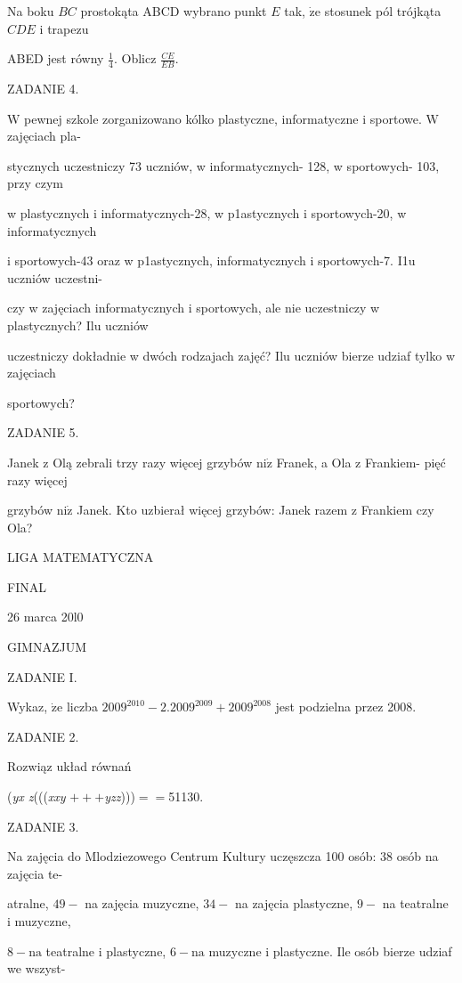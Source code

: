 \documentclass[a4paper,12pt]{article}
\begin{document}
Na boku $BC$ prostokąta ABCD wybrano punkt $E$ tak, $\dot{\mathrm{z}}\mathrm{e}$ stosunek pól trójkąta $CDE$ i trapezu

ABED jest równy $\displaystyle \frac{1}{4}$. Oblicz $\displaystyle \frac{CE}{EB}.$

ZADANIE 4.

$\mathrm{W}$ pewnej szkole zorganizowano kólko plastyczne, informatyczne i sportowe. $\mathrm{W}$ zajęciach pla-

stycznych uczestniczy 73 uczniów, w informatycznych- 128, w sportowych- 103, przy czym

w plastycznych i informatycznych-28, w p1astycznych i sportowych-20, w informatycznych

i sportowych-43 oraz w p1astycznych, informatycznych i sportowych-7. I1u uczniów uczestni-

czy w zajęciach informatycznych i sportowych, ale nie uczestniczy w plastycznych? Ilu uczniów

uczestniczy dokładnie w dwóch rodzajach zajęć? Ilu uczniów bierze udziaf tylko w zajęciach

sportowych?

ZADANIE 5.

Janek z Olą zebrali trzy razy więcej grzybów $\mathrm{n}\mathrm{i}\dot{\mathrm{z}}$ Franek, a Ola z Frankiem- pięć razy więcej

grzybów $\mathrm{n}\mathrm{i}\dot{\mathrm{z}}$ Janek. Kto uzbierał więcej grzybów: Janek razem z Frankiem czy Ola?






LIGA MATEMATYCZNA

FINAL

26 marca 20l0

GIMNAZJUM

ZADANIE I.

Wykaz, $\dot{\mathrm{z}}\mathrm{e}$ liczba $2009^{2010}-2. 2009^{2009}+2009^{2008}$ jest podzielna przez 2008.

ZADANIE 2.

Rozwiąz układ równań

({\it yx  z}((({\it xxy} $+++${\it yzz})))$==$51130.

ZADANIE 3.

Na zajęcia do Mlodziezowego Centrum Kultury uczęszcza 100 osób: 38 osób na zajęcia te-

atralne, $49-$ na zajęcia muzyczne, $34-$ na zajęcia plastyczne, $9-$ na teatralne i muzyczne,

$8-\mathrm{n}\mathrm{a}$ teatralne i plastyczne, $6-\mathrm{n}\mathrm{a}$ muzyczne i plastyczne. Ile osób bierze udziaf we wszyst-
\end{document}
